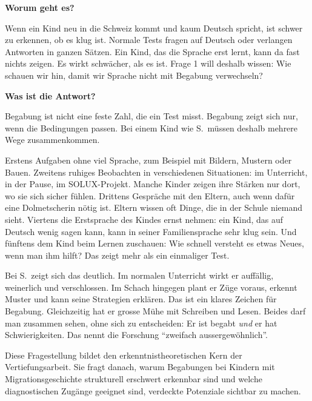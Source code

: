 \documentclass[ngerman, a4paper]{article}
\begin{document}
\begin{frageantwort1}
\textbf{Worum geht es?}

Wenn ein Kind neu in die Schweiz kommt und kaum Deutsch spricht, ist
schwer zu erkennen, ob es klug ist. Normale Tests fragen auf Deutsch
oder verlangen Antworten in ganzen Sätzen. Ein Kind, das die Sprache
erst lernt, kann da fast nichts zeigen. Es wirkt schwächer, als es ist.
Frage 1 will deshalb wissen: Wie schauen wir hin, damit wir Sprache
nicht mit Begabung verwechseln?

\medskip
\textbf{Was ist die Antwort?}

Begabung ist nicht eine feste Zahl, die ein Test misst. Begabung zeigt
sich nur, wenn die Bedingungen passen. Bei einem Kind wie S.~müssen
deshalb mehrere Wege zusammenkommen.

Erstens Aufgaben ohne viel Sprache, zum Beispiel mit Bildern, Mustern
oder Bauen. Zweitens ruhiges Beobachten in verschiedenen Situationen:
im Unterricht, in der Pause, im SOLUX-Projekt. Manche Kinder zeigen
ihre Stärken nur dort, wo sie sich sicher fühlen. Drittens Gespräche
mit den Eltern, auch wenn dafür eine Dolmetscherin nötig ist. Eltern
wissen oft Dinge, die in der Schule niemand sieht. Viertens die
Erstsprache des Kindes ernst nehmen: ein Kind, das auf Deutsch wenig
sagen kann, kann in seiner Familiensprache sehr klug sein. Und
fünftens dem Kind beim Lernen zuschauen: Wie schnell versteht es
etwas Neues, wenn man ihm hilft? Das zeigt mehr als ein einmaliger
Test.

Bei S.~zeigt sich das deutlich. Im normalen Unterricht wirkt er
auffällig, weinerlich und verschlossen. Im Schach hingegen plant er
Züge voraus, erkennt Muster und kann seine Strategien erklären. Das
ist ein klares Zeichen für Begabung. Gleichzeitig hat er grosse Mühe
mit Schreiben und Lesen. Beides darf man zusammen sehen, ohne sich
zu entscheiden: Er ist begabt \emph{und} er hat Schwierigkeiten. Das
nennt die Forschung \enquote{zweifach aussergewöhnlich}.
\end{frageantwort1}
 
Diese Fragestellung bildet den erkenntnistheoretischen Kern der Vertiefungsarbeit. Sie
fragt danach, warum Begabungen bei Kindern mit Migrationsgeschichte strukturell
erschwert erkennbar sind und welche diagnostischen Zugänge geeignet sind, verdeckte Potenziale
sichtbar zu machen.
 
\end{document}
